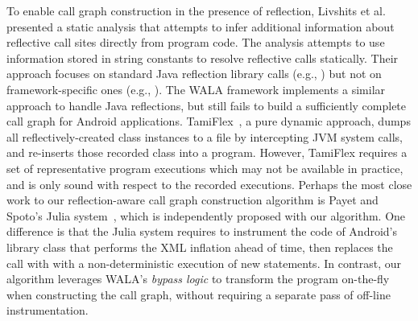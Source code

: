 To enable call graph construction in the presence of  reflection,
Livshits et al.~\cite{Livshits:2005} presented a static analysis
that attempts to infer additional information about
reflective call sites directly from program code. The analysis
attempts to use information stored in string constants to resolve
reflective calls statically. Their approach focuses on standard Java
reflection library calls (e.g., ) but not on
framework-specific ones (e.g., ).
The WALA framework implements a similar approach to handle Java
reflections, but still fails to build a sufficiently complete call graph for
Android applications. TamiFlex~\cite{Bodden:2011}, a pure dynamic
approach, dumps all reflectively-created class instances to a file
by intercepting JVM system calls, and re-inserts those recorded 
class into a program. However, TamiFlex requires a set of representative
program executions which may not be available in practice,
 and is only sound with respect to the recorded executions.
Perhaps the most close work to our reflection-aware call graph
construction algorithm is Payet and Spoto's Julia
system~\cite{Payet:2011:SAA:2032266.2032299}, which is independently
proposed with our algorithm. One difference is that the Julia system
requires to instrument the code of Android's library class
 that performs the XML inflation ahead of time,
then replaces the  call with with a
non-deterministic execution of new statements.
In contrast, our algorithm leverages WALA's \textit{bypass logic}
to transform the program on-the-fly when
constructing the call graph, without requiring a separate pass of
off-line instrumentation.







 

